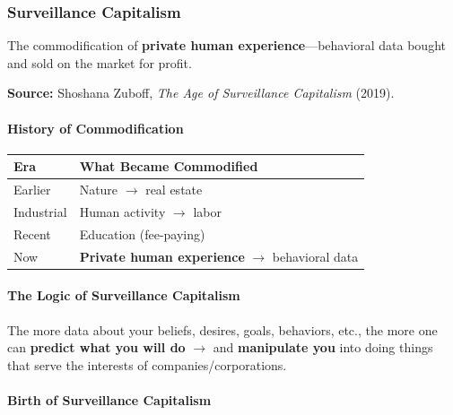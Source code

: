 \bigseparator

\subsubsection{Surveillance Capitalism}

\begin{defbox}
The commodification of \textbf{private human experience}---behavioral data bought and sold on the market for profit.

\textbf{Source:} Shoshana Zuboff, \textit{The Age of Surveillance Capitalism} (2019).
\end{defbox}

\paragraph*{History of Commodification}

\begin{center}
\renewcommand{\arraystretch}{1.2}
\begin{tabular}{@{} l l @{}}
\toprule
\textbf{Era} & \textbf{What Became Commodified} \\
\midrule
Earlier & Nature $\to$ real estate \\
Industrial & Human activity $\to$ labor \\
Recent & Education (fee-paying) \\
Now & \textbf{Private human experience} $\to$ behavioral data \\
\bottomrule
\end{tabular}
\end{center}

\paragraph*{The Logic of Surveillance Capitalism}

\begin{keybox}
The more data about your beliefs, desires, goals, behaviors, etc., the more one can \textbf{predict what you will do} $\to$ and \textbf{manipulate you} into doing things that serve the interests of companies/corporations.
\end{keybox}

\paragraph*{Birth of Surveillance Capitalism}

